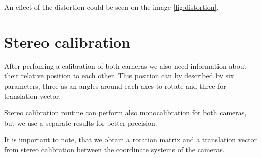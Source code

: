 An effect of the distortion could be seen on the image \ref{fig:distortion}.

\section{Stereo calibration}

After perfoming a calibration of both cameras we also need information about
their relative position to each other. This position can by described by six
parameters, three as an angles around each axes to rotate and three for
translation vector.

Stereo calibration routine can perform also monocalibration for both cameras,
but we use a separate results for better precision.

It is important to note, that we obtain a rotation matrix and a translation
vector from stereo calibration between the coordinate systems of the cameras.
